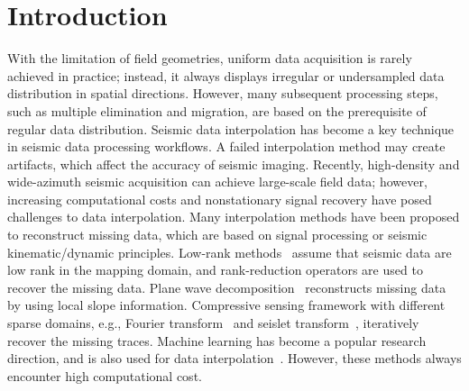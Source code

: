 \section{Introduction}

With the limitation of field geometries, uniform data acquisition is
rarely achieved in practice; instead, it always displays irregular or
undersampled data distribution in spatial directions. However, many
subsequent processing steps, such as multiple elimination and
migration, are based on the prerequisite of regular data distribution.
Seismic data interpolation has become a key technique in seismic data
processing workflows. A failed interpolation method may create
artifacts, which affect the accuracy of seismic imaging. Recently,
high-density and wide-azimuth seismic acquisition can achieve
large-scale field data; however, increasing computational costs and
nonstationary signal recovery have posed challenges to data
interpolation.  Many interpolation methods have been proposed to
reconstruct missing data, which are based on signal processing or
seismic kinematic/dynamic principles.  Low-rank
methods~\citep{Trickett10,Gao13,Chen16,Gao17} assume that seismic data
are low rank in the mapping domain, and rank-reduction operators are
used to recover the missing data.  Plane wave
decomposition~\citep{Fomel02, Hellman16} reconstructs missing data by
using local slope information.  Compressive sensing framework with
different sparse domains, e.g., Fourier transform~\citep{Abma06,
  Wang10} and seislet transform~\citep{Fomel10, Liu10, Gao15},
iteratively recover the missing traces.  Machine learning has become a
popular research direction, and is also used for data
interpolation~\citep{Jia17,Oliveira18, Mandelli19, Kaur19, Zhang20}.
However, these methods always encounter high computational cost.

